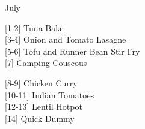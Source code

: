 		\begin{menu}{July}
    
    \begin{recipelist}
    
        {\scriptsize[1-2]} Tuna Bake\\
        {\scriptsize[3-4]} Onion and Tomato Lasagne\\
        {\scriptsize[5-6]} Tofu and Runner Bean Stir Fry\\
        {\scriptsize[7]} Camping Couscous\\%
    \end{recipelist}%
    \begin{recipelist}
    
        {\scriptsize[8-9]} Chicken Curry\\
        {\scriptsize[10-11]} Indian Tomatoes\\
        {\scriptsize[12-13]} Lentil Hotpot\\
        {\scriptsize[14]} Quick Dummy\\%
    \end{recipelist}\par%
  

\end{menu}
